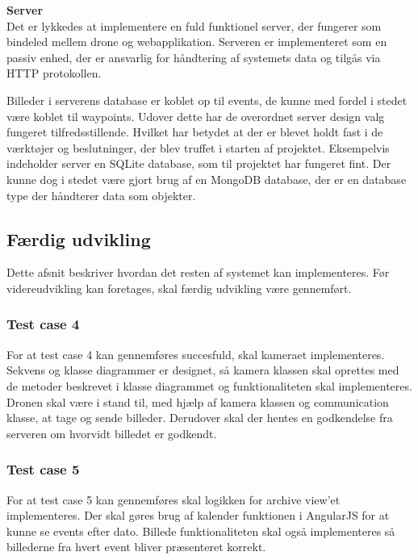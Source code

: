 \newpage

\textbf{Server}\\
Det er lykkedes at implementere en fuld funktionel server, der fungerer som bindeled mellem drone og webapplikation. Serveren er implementeret som en passiv enhed, der er ansvarlig for håndtering af systemets data og tilgås via HTTP protokollen. 

Billeder i serverens database er koblet op til events, de kunne med fordel i stedet være koblet til waypoints. Udover dette har de overordnet server design valg fungeret tilfredsstillende. Hvilket har betydet at der er blevet holdt fast i de værktøjer og beslutninger, der blev truffet i starten af projektet. Eksempelvis indeholder server en SQLite database, som til projektet har fungeret fint. Der kunne dog i stedet være gjort brug af en MongoDB database, der er en database type der håndterer data som objekter.


\newpage

\subsection{Færdig udvikling}
Dette afsnit beskriver hvordan det resten af systemet kan implementeres. Før videreudvikling kan foretages, skal færdig udvikling være gennemført.

\subsubsection*{Test case 4}
For at test case 4 kan gennemføres succesfuld, skal kameraet implementeres. 
Sekvens og klasse diagrammer er designet, så kamera klassen skal oprettes med de metoder beskrevet i klasse diagrammet og funktionaliteten skal implementeres. \\
Dronen skal være i stand til, med hjælp af kamera klassen og communication klasse, at tage og sende billeder. Derudover skal der hentes en godkendelse fra serveren om hvorvidt billedet er godkendt.


\subsubsection*{Test case 5}
For at test case 5 kan gennemføres skal logikken for archive view'et implementeres. Der skal gøres brug af kalender funktionen i AngularJS for at kunne se events efter dato. Billede funktionaliteten skal også implementeres så billederne fra hvert event bliver præsenteret korrekt. 

